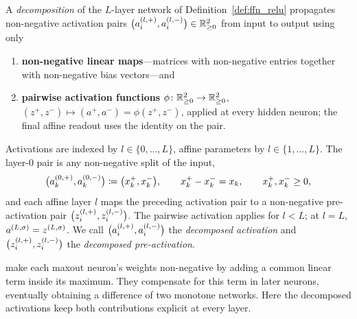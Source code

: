\begin{definition}[Decomposition]\label{def:decomposition}
A \emph{decomposition} of the $L$-layer network of Definition~\ref{def:ffn_relu} propagates non-negative activation pairs $\bigl(a^{(l,+)}_i, a^{(l,-)}_i\bigr) \in \mathbb{R}^2_{\ge 0}$ from input to output using only
\begin{enumerate}
	\item \textbf{non-negative linear maps}---matrices with non-negative entries together with non-negative bias vectors---and
	\item \textbf{pairwise activation functions} $\phi \colon \mathbb{R}^2_{\ge 0} \to \mathbb{R}^2_{\ge 0}$, $(z^+, z^-) \mapsto (a^+, a^-) = \phi(z^+, z^-)$, applied at every hidden neuron; the final affine readout uses the identity on the pair.
\end{enumerate}
Activations are indexed by $l \in \{0,\dots,L\}$, affine parameters by $l \in \{1,\dots,L\}$. The layer-$0$ pair is any non-negative split of the input,
\begin{equation}
	\bigl(a^{(0,+)}_k, a^{(0,-)}_k\bigr) \coloneqq \bigl(x_k^+, x_k^-\bigr),
	\qquad
	x_k^+ - x_k^- = x_k,
	\qquad
	x_k^+, x_k^- \ge 0,
	\label{eq:input_split_convention}
\end{equation}
and each affine layer $l$ maps the preceding activation pair to a non-negative pre-activation pair $\bigl(z^{(l,+)}_i, z^{(l,-)}_i\bigr)$. The pairwise activation applies for $l<L$; at $l=L$, $a^{(L,\sigma)}=z^{(L,\sigma)}$. We call $\bigl(a^{(l,+)}_i,a^{(l,-)}_i\bigr)$ the \emph{decomposed activation} and $\bigl(z^{(l,+)}_i,z^{(l,-)}_i\bigr)$ the \emph{decomposed pre-activation}.
\end{definition}

\textcite[Proposition~4.2]{hertrich2025neuralnetworksvirtualextended} make each maxout neuron's weights non-negative by adding a common linear term inside its maximum. They compensate for this term in later neurons, eventually obtaining a difference of two monotone networks. Here the decomposed activations keep both contributions explicit at every layer.

